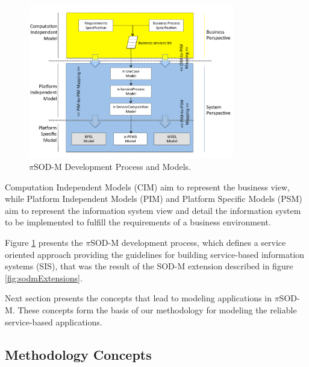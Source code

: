 \begin{figure} [ht!]
\centering
\includegraphics[width=0.8\textwidth]{fig/PiSOD-MProcess}
\caption{$\pi$SOD-M Development Process and Models.}
\label{fig:developmentProcess}
\end{figure}


 Computation Independent Models (CIM) aim to represent the business view, while
 Platform Independent Models (PIM) and Platform Specific Models (PSM) aim
 to represent the information system view and detail the information system to
 be implemented to fulfill the requirements of a business environment.

 Figure \ref{fig:developmentProcess} presents the $\pi$SOD-M development
 process, which defines a service oriented approach providing the guidelines for
 building service-based information systems (SIS), that was the result of the
 SOD-M extension described in figure \ref{fig:sodmExtensions}. 
 

Next section presents the concepts that lead to modeling applications in
$\pi$SOD-M. These concepts form the basis of our methodology for modeling the
reliable service-based applications. 

\subsection{Methodology Concepts} 
\label{sec:concepts}


